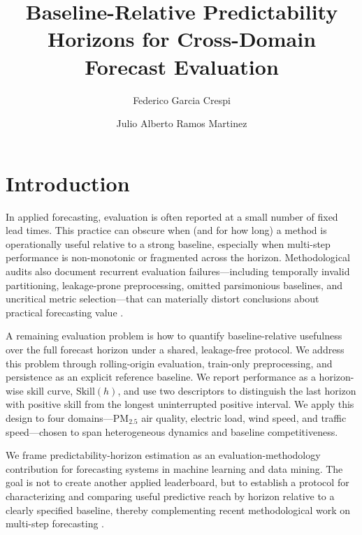 \documentclass[pdflatex]{sn-jnl}
\title[Baseline-relative predictability horizons]{Baseline-Relative Predictability Horizons for Cross-Domain Forecast Evaluation}
\author*[1]{Federico Garcia Crespi}
\author[2]{Julio Alberto Ramos Martinez}
\affil[1]{Departamento de Ingenier\'ia de Computadores, Universidad Miguel Hern\'andez, Elche, Spain}
\affil[2]{Departamento de Estad\'istica, Matem\'aticas e Inform\'atica, Universidad Miguel Hern\'andez, Elche, Spain}
\begin{document}
\maketitle






\section{Introduction}

In applied forecasting, evaluation is often reported at a small number of fixed lead times. This practice can obscure when (and for how long) a method is operationally useful relative to a strong baseline, especially when multi-step performance is non-monotonic or fragmented across the horizon. Methodological audits also document recurrent evaluation failures—including temporally invalid partitioning, leakage-prone preprocessing, omitted parsimonious baselines, and uncritical metric selection—that can materially distort conclusions about practical forecasting value \citep{hewamalage2023dmkd}.

A remaining evaluation problem is how to quantify baseline-relative usefulness over the full forecast horizon under a shared, leakage-free protocol. We address this problem through rolling-origin evaluation, train-only preprocessing, and persistence as an explicit reference baseline. We report performance as a horizon-wise skill curve, $\mathrm{Skill}(h)$, and use two descriptors to distinguish the last horizon with positive skill from the longest uninterrupted positive interval. We apply this design to four domains---PM$_{2.5}$ air quality, electric load, wind speed, and traffic speed---chosen to span heterogeneous dynamics and baseline competitiveness.

We frame predictability-horizon estimation as an evaluation-methodology contribution for forecasting systems in machine learning and data mining. The goal is not to create another applied leaderboard, but to establish a protocol for characterizing and comparing useful predictive reach by horizon relative to a clearly specified baseline, thereby complementing recent methodological work on multi-step forecasting \citep{green2025stratify,kreuzer2025trend}.
\end{document}
